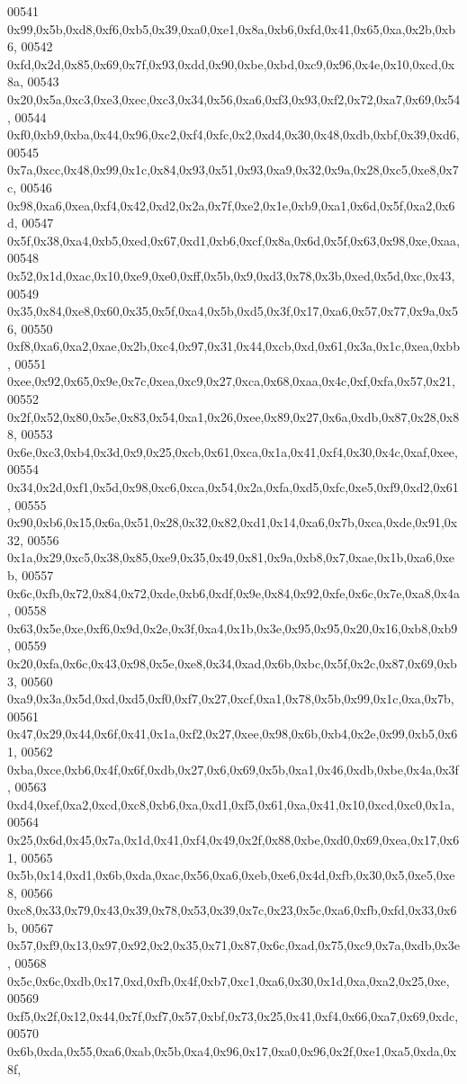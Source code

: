 \begin{DoxyCode}
00541   0x99,0x5b,0xd8,0xf6,0xb5,0x39,0xa0,0xe1,0x8a,0xb6,0xfd,0x41,0x65,0xa,0x2b,0xb6,
00542   0xfd,0x2d,0x85,0x69,0x7f,0x93,0xdd,0x90,0xbe,0xbd,0xc9,0x96,0x4e,0x10,0xcd,0x8a,
00543   0x20,0x5a,0xc3,0xe3,0xec,0xc3,0x34,0x56,0xa6,0xf3,0x93,0xf2,0x72,0xa7,0x69,0x54,
00544   0xf0,0xb9,0xba,0x44,0x96,0xc2,0xf4,0xfc,0x2,0xd4,0x30,0x48,0xdb,0xbf,0x39,0xd6,
00545   0x7a,0xcc,0x48,0x99,0x1c,0x84,0x93,0x51,0x93,0xa9,0x32,0x9a,0x28,0xc5,0xe8,0x7c,
00546   0x98,0xa6,0xea,0xf4,0x42,0xd2,0x2a,0x7f,0xe2,0x1e,0xb9,0xa1,0x6d,0x5f,0xa2,0x6d,
00547   0x5f,0x38,0xa4,0xb5,0xed,0x67,0xd1,0xb6,0xcf,0x8a,0x6d,0x5f,0x63,0x98,0xe,0xaa,
00548   0x52,0x1d,0xac,0x10,0xe9,0xe0,0xff,0x5b,0x9,0xd3,0x78,0x3b,0xed,0x5d,0xc,0x43,
00549   0x35,0x84,0xe8,0x60,0x35,0x5f,0xa4,0x5b,0xd5,0x3f,0x17,0xa6,0x57,0x77,0x9a,0x56,
00550   0xf8,0xa6,0xa2,0xae,0x2b,0xc4,0x97,0x31,0x44,0xcb,0xd,0x61,0x3a,0x1c,0xea,0xbb,
00551   0xee,0x92,0x65,0x9e,0x7c,0xea,0xc9,0x27,0xca,0x68,0xaa,0x4c,0xf,0xfa,0x57,0x21,
00552   0x2f,0x52,0x80,0x5e,0x83,0x54,0xa1,0x26,0xee,0x89,0x27,0x6a,0xdb,0x87,0x28,0x88,
00553   0x6e,0xc3,0xb4,0x3d,0x9,0x25,0xcb,0x61,0xca,0x1a,0x41,0xf4,0x30,0x4c,0xaf,0xee,
00554   0x34,0x2d,0xf1,0x5d,0x98,0xc6,0xca,0x54,0x2a,0xfa,0xd5,0xfc,0xe5,0xf9,0xd2,0x61,
00555   0x90,0xb6,0x15,0x6a,0x51,0x28,0x32,0x82,0xd1,0x14,0xa6,0x7b,0xca,0xde,0x91,0x32,
00556   0x1a,0x29,0xc5,0x38,0x85,0xe9,0x35,0x49,0x81,0x9a,0xb8,0x7,0xae,0x1b,0xa6,0xeb,
00557   0x6c,0xfb,0x72,0x84,0x72,0xde,0xb6,0xdf,0x9e,0x84,0x92,0xfe,0x6c,0x7e,0xa8,0x4a,
00558   0x63,0x5e,0xe,0xf6,0x9d,0x2e,0x3f,0xa4,0x1b,0x3e,0x95,0x95,0x20,0x16,0xb8,0xb9,
00559   0x20,0xfa,0x6c,0x43,0x98,0x5e,0xe8,0x34,0xad,0x6b,0xbc,0x5f,0x2c,0x87,0x69,0xb3,
00560   0xa9,0x3a,0x5d,0xd,0xd5,0xf0,0xf7,0x27,0xcf,0xa1,0x78,0x5b,0x99,0x1c,0xa,0x7b,
00561   0x47,0x29,0x44,0x6f,0x41,0x1a,0xf2,0x27,0xee,0x98,0x6b,0xb4,0x2e,0x99,0xb5,0x61,
00562   0xba,0xce,0xb6,0x4f,0x6f,0xdb,0x27,0x6,0x69,0x5b,0xa1,0x46,0xdb,0xbe,0x4a,0x3f,
00563   0xd4,0xef,0xa2,0xcd,0xc8,0xb6,0xa,0xd1,0xf5,0x61,0xa,0x41,0x10,0xcd,0xc0,0x1a,
00564   0x25,0x6d,0x45,0x7a,0x1d,0x41,0xf4,0x49,0x2f,0x88,0xbe,0xd0,0x69,0xea,0x17,0x61,
00565   0x5b,0x14,0xd1,0x6b,0xda,0xac,0x56,0xa6,0xeb,0xe6,0x4d,0xfb,0x30,0x5,0xe5,0xe8,
00566   0xc8,0x33,0x79,0x43,0x39,0x78,0x53,0x39,0x7c,0x23,0x5c,0xa6,0xfb,0xfd,0x33,0x6b,
00567   0x57,0xf9,0x13,0x97,0x92,0x2,0x35,0x71,0x87,0x6c,0xad,0x75,0xc9,0x7a,0xdb,0x3e,
00568   0x5c,0x6c,0xdb,0x17,0xd,0xfb,0x4f,0xb7,0xc1,0xa6,0x30,0x1d,0xa,0xa2,0x25,0xe,
00569   0xf5,0x2f,0x12,0x44,0x7f,0xf7,0x57,0xbf,0x73,0x25,0x41,0xf4,0x66,0xa7,0x69,0xdc,
00570   0x6b,0xda,0x55,0xa6,0xab,0x5b,0xa4,0x96,0x17,0xa0,0x96,0x2f,0xe1,0xa5,0xda,0x8f,

\end{DoxyCode}
